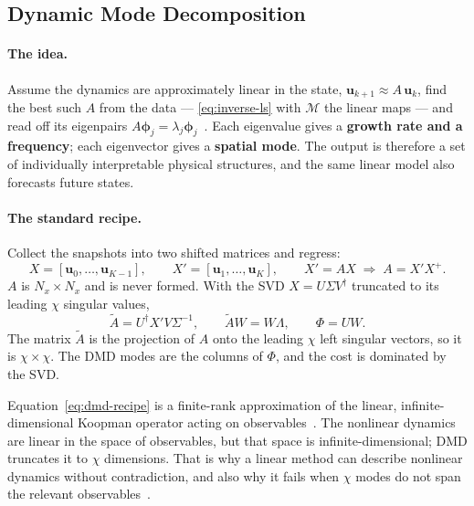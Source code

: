 \subsection{Dynamic Mode Decomposition}
\label{subsec:dmd}

\paragraph{The idea.}
Assume the dynamics are approximately linear in the state,
$\mathbf u_{k+1} \approx A\,\mathbf u_k$, find the best such $A$ from the data
--- \eqref{eq:inverse-ls} with $\mathcal M$ the linear maps --- and read off its
eigenpairs $A\boldsymbol\phi_j = \lambda_j\boldsymbol\phi_j$~\cite{Schmid2010,Kutz2016}.
Each eigenvalue gives a \textbf{growth rate and a frequency}; each eigenvector
gives a \textbf{spatial mode}. The output is therefore a set of individually
interpretable physical structures, and the same linear model also forecasts
future states.

\paragraph{The standard recipe.}
Collect the snapshots into two shifted matrices and regress:
\begin{equation}
  X  = [\mathbf u_0, \dots, \mathbf u_{K-1}], \qquad
  X' = [\mathbf u_1, \dots, \mathbf u_{K}], \qquad
  X' = AX \;\Longrightarrow\; A = X'X^{+} .
  \label{eq:dmd-regression}
\end{equation}%
$A$ is $N_x\times N_x$ and is never formed. With the SVD $X = U\Sigma V^\dagger$
truncated to its leading $\chi$ singular values,
\begin{equation}
  \tilde{A} = U^{\dagger} X' V \Sigma^{-1}, \qquad
  \tilde{A} W = W\Lambda, \qquad
  \Phi = UW .
  \label{eq:dmd-recipe}
\end{equation}%
The matrix $\tilde{A}$ is the projection of $A$ onto the leading $\chi$ left
singular vectors, so it is $\chi \times \chi$. The DMD modes are the columns of
$\Phi$, and the cost is dominated by the SVD.

\begin{remark}
  Equation~\eqref{eq:dmd-recipe} is a finite-rank approximation of the linear,
  infinite-dimensional Koopman operator acting on
  observables~\cite{Mezic2005,Rowley2009,Tu2014}. The nonlinear dynamics are
  linear in the space of observables, but that space is infinite-dimensional;
  DMD truncates it to $\chi$ dimensions. That is why a linear method can
  describe nonlinear dynamics without contradiction, and also why it fails when
  $\chi$ modes do not span the relevant observables~\cite{Williams2015,Colbrook2024}.
\end{remark}

